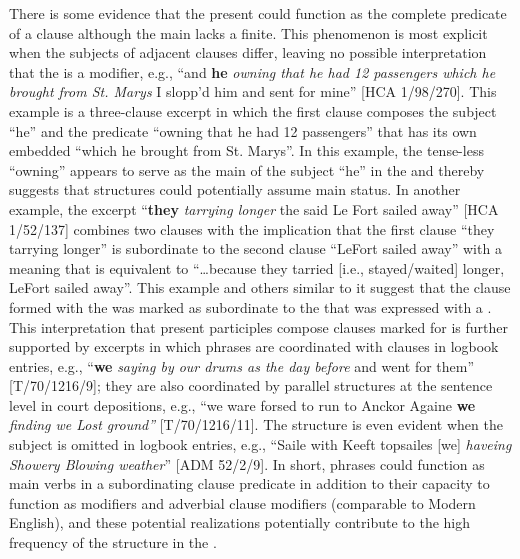 There is some evidence that the present  could function as the complete predicate of a clause although the main  lacks a finite. This phenomenon is most explicit when the subjects of adjacent clauses differ, leaving no possible interpretation that the  is a modifier, e.g., “and \textbf{he} \textit{owning that he had 12 passengers which he brought from St. Marys} I slopp’d him and sent for mine” [HCA 1/98/270]. This example is a three-clause excerpt in which the first clause composes the subject “he” and the predicate “owning that he had 12 passengers” that has its own embedded  “which he brought from St. Marys”. In this example, the tense-less  “owning” appears to serve as the main  of the subject “he” in the  and thereby suggests that  structures could potentially assume main  status. In another example, the excerpt “\textbf{they} \textit{tarrying longer} the said Le Fort sailed away” [HCA 1/52/137] combines two clauses with the implication that the first clause “they tarrying longer” is subordinate to the second clause “LeFort sailed away” with a meaning that is equivalent to “…because they tarried [i.e., stayed/waited] longer, LeFort sailed away”. This example and others similar to it suggest that the clause formed with the  was marked as subordinate to the  that was expressed with a . This interpretation that present participles compose clauses marked for  is further supported by excerpts in which  phrases are coordinated with clauses in logbook entries, e.g., “\textbf{we} \textit{saying by our drums as the day before} and went for them” [T/70/1216/9]; they are also coordinated by parallel structures at the sentence level in court depositions, e.g., “we ware forsed to run to Anckor Againe \textbf{we} \textit{finding we Lost ground”} [T/70/1216/11]. The structure is even evident when the  subject is omitted in logbook entries, e.g., “Saile with Keeft topsailes [we] \textit{haveing Showery Blowing weather}” [ADM 52/2/9]. In short,  phrases could function as main verbs in a subordinating clause predicate in addition to their capacity to function as   modifiers and adverbial clause modifiers (comparable to Modern English), and these potential realizations potentially contribute to the high frequency of the structure in the . 


